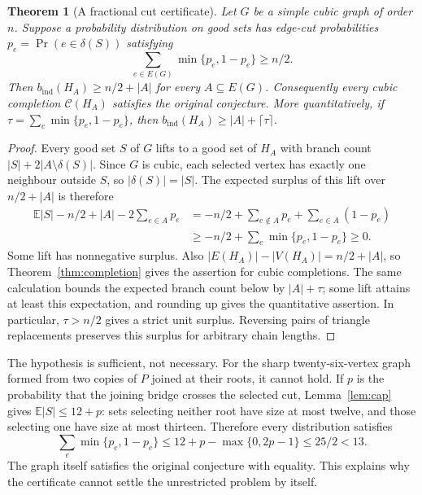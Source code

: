 \documentclass[11pt]{article}
\newtheorem{theorem}{Theorem}[section]
\newcommand{\bind}{b_{\mathrm{ind}}}
\begin{document}
\begin{theorem}[A fractional cut certificate]\label{thm:cut-certificate}
Let $G$ be a simple cubic graph of order $n$. Suppose a probability
distribution on good sets has edge-cut probabilities
$p_e=\Pr(e\in\delta(S))$ satisfying
\begin{equation}\label{eq:cut-certificate}
 \sum_{e\in E(G)}\min\{p_e,1-p_e\}\geq n/2.
\end{equation}
Then $\bind(H_A)\geq n/2+|A|$ for every $A\subseteq E(G)$.
Consequently every cubic completion $\mathcal C(H_A)$ satisfies
the original conjecture. More quantitatively, if
$\tau=\sum_e\min\{p_e,1-p_e\}$, then
$\bind(H_A)\geq |A|+\lceil\tau\rceil$.
\end{theorem}
\begin{proof}
Every good set $S$ of $G$ lifts to a good set of $H_A$ with
branch count $|S|+2|A\setminus\delta(S)|$. Since $G$ is cubic,
each selected vertex has exactly one neighbour outside $S$, so
$|\delta(S)|=|S|$. The expected surplus of this lift over
$n/2+|A|$ is therefore
\begin{align*}
 \mathbb E|S|-n/2+|A|-2\sum_{e\in A}p_e
 &= -n/2+\sum_{e\notin A}p_e+\sum_{e\in A}(1-p_e)\\
 &\geq -n/2+\sum_e\min\{p_e,1-p_e\}\geq0.
\end{align*}
Some lift has nonnegative surplus. Also
$|E(H_A)|-|V(H_A)|=n/2+|A|$, so Theorem~\ref{thm:completion}
gives the assertion for cubic completions.
The same calculation bounds the expected branch count below by
$|A|+\tau$; some lift attains at least this expectation, and
rounding up gives the quantitative assertion. In particular,
$\tau>n/2$ gives a strict unit surplus. Reversing pairs of triangle
replacements preserves this surplus for arbitrary chain lengths.
\end{proof}

The hypothesis is sufficient, not necessary. For the sharp
twenty-six-vertex graph formed from two copies of $P$ joined at
their roots, it cannot hold. If $p$ is the probability that the
joining bridge crosses the selected cut, Lemma~\ref{lem:cap}
gives $\mathbb E|S|\leq12+p$: sets selecting neither root have
size at most twelve, and those selecting one have size at most
thirteen. Therefore every distribution satisfies
\[
 \sum_e\min\{p_e,1-p_e\}
 \leq12+p-\max\{0,2p-1\}\leq25/2<13.
\]
The graph itself satisfies the original conjecture with equality.
This explains why the certificate cannot settle the unrestricted
problem by itself.
\end{document}
